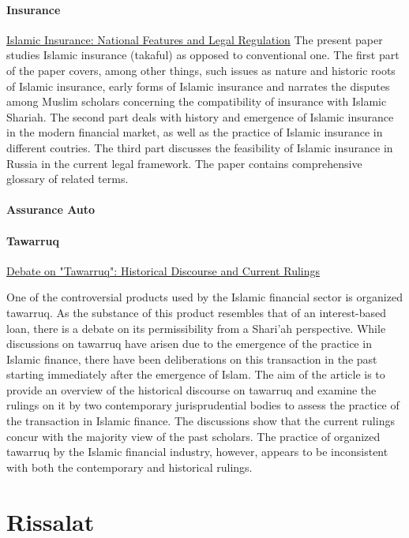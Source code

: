 \paragraph{Insurance} \href{https://www-jstor-org.icp.idm.oclc.org/stable/27650571?pq-origsite=summon}{Islamic Insurance: National Features and Legal Regulation} The present paper studies Islamic insurance (takaful) as opposed to conventional one. The first part of the paper covers, among other things, such issues as nature and historic roots of Islamic insurance, early forms of Islamic insurance and narrates the disputes among Muslim scholars concerning the compatibility of insurance with Islamic Shariah. The second part deals with history and emergence of Islamic insurance in the modern financial market, as well as the practice of Islamic insurance in different coutries. The third part discusses the feasibility of Islamic insurance in Russia in the current legal framework. The paper contains comprehensive glossary of related terms.
\paragraph{Assurance Auto}

\paragraph{Tawarruq} \href{https://www-jstor-org.icp.idm.oclc.org/stable/43294670?pq-origsite=summon&seq=1}{Debate on "Tawarruq": Historical Discourse and Current Rulings}

One of the controversial products used by the Islamic financial sector is organized tawarruq. As the substance of this product resembles that of an interest-based loan, there is a debate on its permissibility from a Shari'ah perspective. While discussions on tawarruq have arisen due to the emergence of the practice in Islamic finance, there have been deliberations on this transaction in the past starting immediately after the emergence of Islam. The aim of the article is to provide an overview of the historical discourse on tawarruq and examine the rulings on it by two contemporary jurisprudential bodies to assess the practice of the transaction in Islamic finance. The discussions show that the current rulings concur with the majority view of the past scholars. The practice of organized tawarruq by the Islamic financial industry, however, appears to be inconsistent with both the contemporary and historical rulings.

\section{Rissalat}

